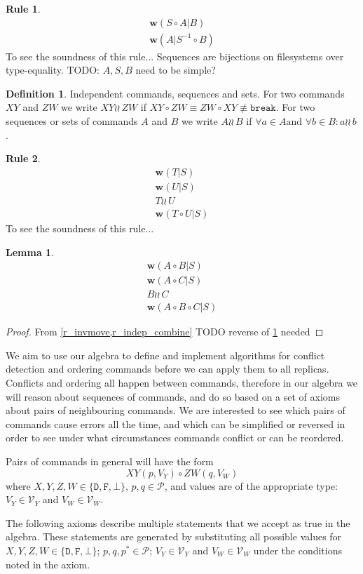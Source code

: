 \documentclass[12pt]{article}
\newcommand{\setvx}[1]{\mathcal{V}_{#1}}
\newcommand{\setp}{\mathcal{P}}
\newcommand{\empt}{\bot}
\newcommand{\pp}{p^*} %
\newcommand{\cbrk}{\mathtt{break}}
\newcommand{\fscommand}[2]{{#1#2}}
\newcommand{\fsregcommandchar}[1]{\mathtt{#1}}
\newcommand{\cxy}{\fscommand{X}{Y}}
\newcommand{\czw}{\fscommand{Z}{W}}
\newcommand{\typeset}{\{\fsregcommandchar{D},\fsregcommandchar{F},\empt\}} %
\newcommand{\cc}{\circ}
\newcommand{\nequiv}{\not\equiv}
\newcommand{\indep}{\wr\!\!\wr\,} %
\newcommand{\worksc}[2]{{\mathbf{w}}({#1}|{#2})}
\newcommand{\infer}[2]{\begin{array}{c}{#1}\\\hline{#2}\end{array}}
\newcommand{\inferrr}[4]{\begin{array}{c}{#1}\\{#2}\\{#3}\\\hline{#4}\end{array}}
\theoremstyle{definition}
\newtheorem{mydef}{Definition}
\newtheorem{mylem}{Lemma}
\newtheorem{myrul}{Rule}
\begin{document}
\begin{myrul}\label{r_invmove}
\[ \infer{\worksc{S\cc A}{B}}{\worksc{A}{S^{-1}\cc B}} \]
To see the soundness of this rule...
Sequences are bijections on filesystems over type-equality.
TODO: $A,S,B$ need to be simple?
\end{myrul}

\begin{mydef}{Independent commands, sequences and sets.}
For two commands $\cxy$ and $\czw$ we write $\cxy\indep\czw$ if $\cxy\cc \czw\equiv\czw\cc \cxy\nequiv\cbrk$.
For two sequences or sets of commands $A$ and $B$ we write $A\indep B$ if
$\forall a\in A \mbox{and~} \forall b\in B: a\indep b$.
\end{mydef}

\begin{myrul}\label{r_indep_combine}
\[ \inferrr{\worksc{T}{S}}{\worksc{U}{S}}{T\indep U}{\worksc{T\cc U}{S}} \]
To see the soundness of this rule...
\end{myrul}

\begin{mylem}\label{indep_prefix_combine}
\[ \inferrr{\worksc{A\cc B}{S}}{\worksc{A\cc C}{S}}{B\indep C}{\worksc{A\cc B\cc C}{S}} \]
\end{mylem}
\begin{proof}
From \cref{r_invmove,r_indep_combine}
TODO reverse of \cref{r_invmove} needed
\end{proof}

We aim to use our algebra to define and implement algorithms for conflict detection
and ordering commands before we can apply them to all replicas.
Conflicts and ordering all happen between commands, therefore in our algebra
we will reason about sequences of commands, 
and do so based on a set of axioms about pairs of neighbouring commands.
We are interested to see which pairs of commands cause errors all the time,
and which can be simplified or reversed
in order to see under what circumstances commands conflict or can be reordered.

Pairs of commands in general will have the form
\[ \cxy(p,V_Y)\cc  \czw(q,V_W) \]
where $X,Y,Z,W\in\typeset$, $p,q\in\setp$, 
and values are of the appropriate type: 
$V_Y\in\setvx{Y}$ and $V_W\in\setvx{W}$.

The following axioms describe multiple statements
that we accept as true in the algebra.
These statements are generated by substituting 
all possible values for
$X,Y,Z,W\in\typeset$; $p,q,\pp\in\setp$; $V_Y\in\setvx{Y}$ and $V_W\in\setvx{W}$
under the conditions noted in the axiom.
\end{document}
